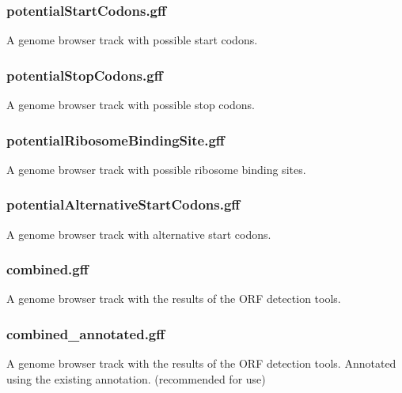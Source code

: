 \documentclass[10pt,a4paper]{article}
\begin{document}
\subsubsection*{potentialStartCodons.gff}
A genome browser track with possible start codons.
\subsubsection*{potentialStopCodons.gff}
A genome browser track with possible stop codons.
\subsubsection*{potentialRibosomeBindingSite.gff}
A genome browser track with possible ribosome binding sites.
\subsubsection*{potentialAlternativeStartCodons.gff}
A genome browser track with alternative start codons.
\subsubsection*{combined.gff}
A genome browser track with the results of the ORF detection tools.
\subsubsection*{combined\_annotated.gff}
A genome browser track with the results of the ORF detection tools. Annotated using the existing annotation. (recommended for use)
\end{document}
